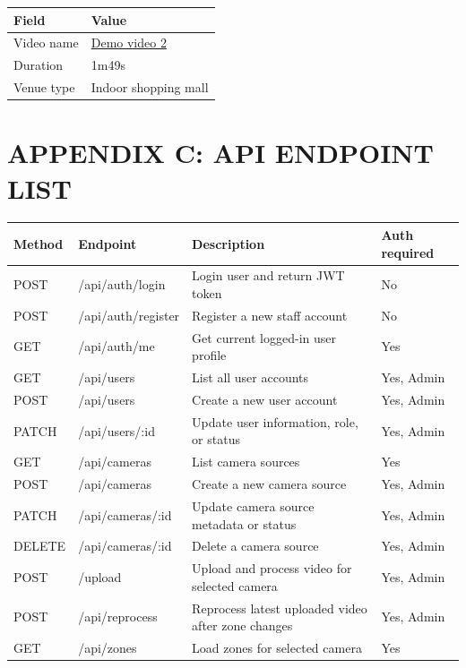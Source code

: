 \documentclass[12pt,a4paper]{report}
\begin{document}
\begin{longtable}{|p{4cm}|p{10cm}|}
\hline
\rowcolor{HeaderBlue}\textbf{Field} & \textbf{Value} \\
\hline
Video name & \href{https://drive.google.com/drive/folders/1yck6yxGl0HNDY765-ukM-afK5mTJDRr4?usp=drive_link}{Demo video 2} \\
\hline
Duration & 1m49s \\
\hline
Venue type & Indoor shopping mall \\
\hline
\end{longtable}

\chapter*{APPENDIX C: API ENDPOINT LIST}

\begin{longtable}{|p{2.5cm}|p{4.2cm}|p{5.2cm}|p{3cm}|}
\hline
\rowcolor{HeaderBlue}
\textbf{Method} & \textbf{Endpoint} & \textbf{Description} & \textbf{Auth required} \\
\hline
POST & /api/auth/login & Login user and return JWT token & No \\
\hline
POST & /api/auth/register & Register a new staff account & No \\
\hline
GET & /api/auth/me & Get current logged-in user profile & Yes \\
\hline
GET & /api/users & List all user accounts & Yes, Admin \\
\hline
POST & /api/users & Create a new user account & Yes, Admin \\
\hline
PATCH & /api/users/:id & Update user information, role, or status & Yes, Admin \\
\hline
GET & /api/cameras & List camera sources & Yes \\
\hline
POST & /api/cameras & Create a new camera source & Yes, Admin \\
\hline
PATCH & /api/cameras/:id & Update camera source metadata or status & Yes, Admin \\
\hline
DELETE & /api/cameras/:id & Delete a camera source & Yes, Admin \\
\hline
POST & /upload & Upload and process video for selected camera & Yes, Admin \\
\hline
POST & /api/reprocess & Reprocess latest uploaded video after zone changes & Yes, Admin \\
\hline
GET & /api/zones & Load zones for selected camera & Yes \\

\end{longtable}
\end{document}
